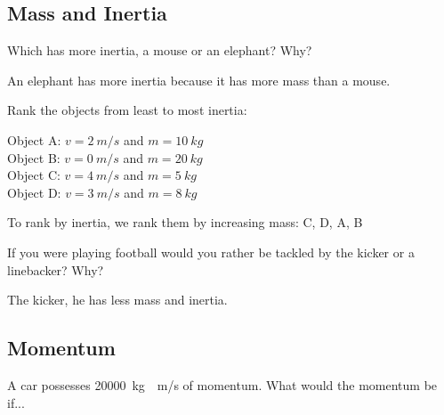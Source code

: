 \documentclass[../main-physics-problems.tex]{subfiles}
\begin{document}
\begin{questions}
\begin{EnvUplevel}
    \subsection{Mass and Inertia}
\end{EnvUplevel}

\question
Which has more inertia, a mouse or an elephant? Why?

\begin{solution}
    An elephant has more inertia because it has more mass than a mouse.
\end{solution}

\question
Rank the objects from least to most inertia:

Object A: $v = \SI{2}{m/s}$ and $m = \SI{10}{kg}$\\
Object B: $v = \SI{0}{m/s}$ and $m = \SI{20}{kg}$\\
Object C: $v = \SI{4}{m/s}$ and $m = \SI{5}{kg}$\\
Object D: $v = \SI{3}{m/s}$ and $m = \SI{8}{kg}$

\begin{solution}
    To rank by inertia, we rank them by increasing mass: C, D, A, B
\end{solution}

\question
If you were playing football would you rather be tackled by the kicker or a linebacker? Why?

\begin{solution}
    The kicker, he has less mass and inertia.
\end{solution}

\clearpage
\begin{EnvUplevel}
    \subsection{Momentum}
\end{EnvUplevel}

\question

A car possesses \SI[group-separator={,}]{20000}{kg\cdot m/s} of momentum. What would the momentum be if...

\end{questions}
\end{document}
